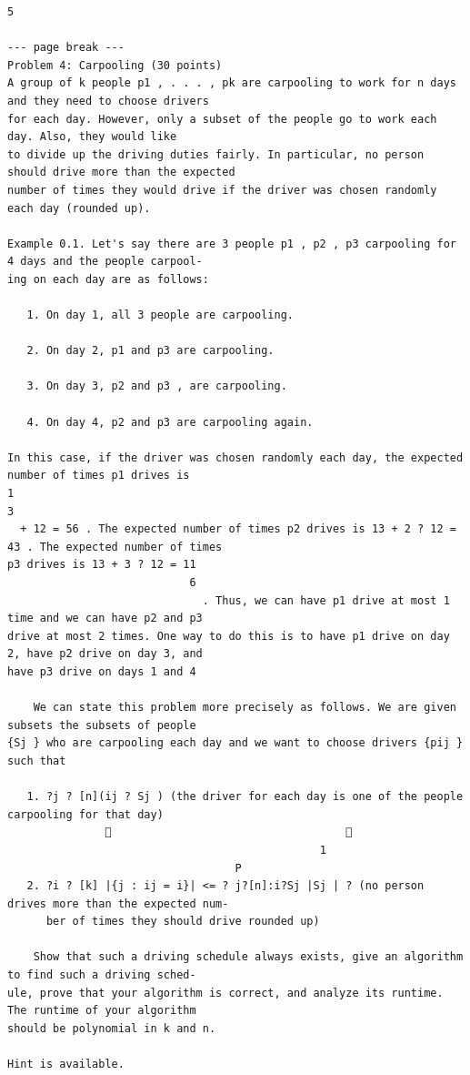 \documentclass[12pt]{article}
\begin{document}
\begin{Verbatim}[breaklines=true,fontsize=\small]
                                                      5

--- page break ---
Problem 4: Carpooling (30 points)
A group of k people p1 , . . . , pk are carpooling to work for n days and they need to choose drivers
for each day. However, only a subset of the people go to work each day. Also, they would like
to divide up the driving duties fairly. In particular, no person should drive more than the expected
number of times they would drive if the driver was chosen randomly each day (rounded up).

Example 0.1. Let's say there are 3 people p1 , p2 , p3 carpooling for 4 days and the people carpool-
ing on each day are as follows:

   1. On day 1, all 3 people are carpooling.

   2. On day 2, p1 and p3 are carpooling.

   3. On day 3, p2 and p3 , are carpooling.

   4. On day 4, p2 and p3 are carpooling again.

In this case, if the driver was chosen randomly each day, the expected number of times p1 drives is
1
3
  + 12 = 56 . The expected number of times p2 drives is 13 + 2 ? 12 = 43 . The expected number of times
p3 drives is 13 + 3 ? 12 = 11
                            6
                              . Thus, we can have p1 drive at most 1 time and we can have p2 and p3
drive at most 2 times. One way to do this is to have p1 drive on day 2, have p2 drive on day 3, and
have p3 drive on days 1 and 4

    We can state this problem more precisely as follows. We are given subsets the subsets of people
{Sj } who are carpooling each day and we want to choose drivers {pij } such that

   1. ?j ? [n](ij ? Sj ) (the driver for each day is one of the people carpooling for that day)
                                                   
                                                1
                                   P
   2. ?i ? [k] |{j : ij = i}| <= ? j?[n]:i?Sj |Sj | ? (no person drives more than the expected num-
      ber of times they should drive rounded up)

    Show that such a driving schedule always exists, give an algorithm to find such a driving sched-
ule, prove that your algorithm is correct, and analyze its runtime. The runtime of your algorithm
should be polynomial in k and n.

Hint is available.


\end{Verbatim}
\end{document}
